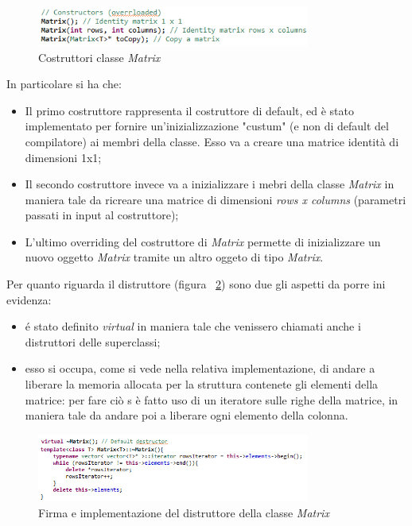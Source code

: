 \begin{figure}[h]
	\centering
	\includegraphics[width=0.8\textwidth]{Immagini/MatrixConstructors.png}
	\caption{Costruttori classe \textit{Matrix}}
	\label{fig:matrixInit}
\end{figure}

In particolare si ha che:
\begin{itemize}
	\item Il primo costruttore rappresenta il costruttore di default, ed è stato implementato per fornire un'inizializzazione "custum" (e non di default del compilatore) ai membri della classe. Esso va a creare una matrice identità di dimensioni 1x1;
	\item Il secondo costruttore invece va a inizializzare i mebri della classe \textit{Matrix} in maniera tale da ricreare una matrice di dimensioni \textit{rows x columns} (parametri passati in input al costruttore);
	\item L'ultimo overriding del costruttore di \textit{Matrix} permette di inizializzare un nuovo oggetto \textit{Matrix} tramite un altro oggeto di tipo \textit{Matrix}.
\end{itemize}

Per quanto riguarda il distruttore (figura ~\ref{fig:matrixDeInit}) sono due gli aspetti da porre ini evidenza:
\begin{itemize}
	\item é stato definito \textit{virtual} in maniera tale che venissero chiamati anche i distruttori delle superclassi;
	\item esso si occupa, come si vede nella relativa implementazione, di andare a liberare la memoria allocata per la struttura contenete gli elementi della matrice: per fare ciò s è fatto uso di un iteratore sulle righe della matrice, in maniera tale da andare poi a liberare ogni elemento della colonna.
\end{itemize}

\begin{figure}[h]
	\centering
	\includegraphics[width=0.8\textwidth]{Immagini/MatrixDestructors.png}
	\caption{Firma e implementazione del distruttore della classe \textit{Matrix}}
	\label{fig:matrixDeInit}
\end{figure}

